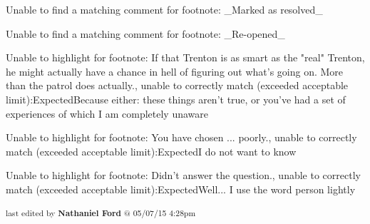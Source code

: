 	Unable to find a matching comment for footnote: _Marked as resolved_

	Unable to find a matching comment for footnote: _Re-opened_

	Unable to highlight for footnote: If that Trenton is as smart as the "real" Trenton, he might actually have a chance in hell of figuring out what's going on. More than the patrol does actually., unable to correctly match (exceeded acceptable limit):ExpectedBecause either: these things aren’t true, or you’ve had a set of experiences of which I am completely unaware

	Unable to highlight for footnote: You have chosen ... poorly., unable to correctly match (exceeded acceptable limit):ExpectedI do not want to know

	Unable to highlight for footnote: Didn't answer the question., unable to correctly match (exceeded acceptable limit):ExpectedWell... I use the word person lightly


\fi

\vspace{\fill}

\begin{flushright}
\textsubscript{last edited by \textbf{Nathaniel Ford} @ 05/07/15 4:28pm}
\end{flushright}


